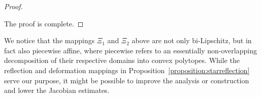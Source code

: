 \documentclass[10pt,letterpaper]{article}
\begin{document}
\begin{proof}
\begin{itemize}

    \end{itemize}
    The proof is complete. 
\end{proof}







\begin{remark}
    We notice that the mappings $\Xi_{1}$ and $\Xi_{2}$ above are not only bi-Lipschitz, but in fact also piecewise affine, 
    where piecewise refers to an essentially non-overlapping decomposition of their respective domains into convex polytopes.
    While the reflection and deformation mappings in Proposition~\ref{proposition:starreflection} serve our purpose,
    it might be possible to improve the analysis or construction and lower the Jacobian estimates. 
\end{remark}
\end{document}
